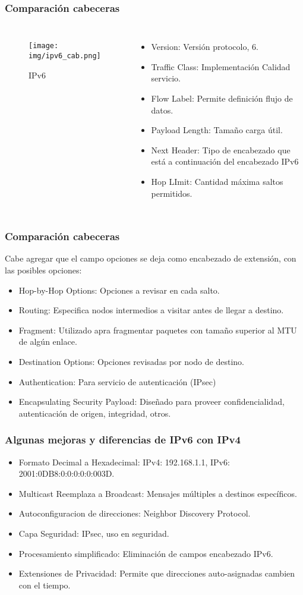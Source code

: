 \documentclass{beamer}
\begin{document}
\begin{frame}
  \frametitle{Comparación cabeceras}
  \begin{columns}[t]
    	\begin{figure}
		\centering
		\texttt{[image: img/ipv6\_cab.png]}
		\caption{IPv6}
	\end{figure}
    	\begin{itemize}
		\small
		\item
			Version: Versión protocolo, 6.
		\item
			Traffic Class: Implementación Calidad servicio.
		\item
			Flow Label: Permite definición flujo de datos.
		\item
			Payload Length: Tamaño carga útil.
		\item
			Next Header: Tipo de encabezado que está a 
			continuación del encabezado IPv6
		\item
			Hop LImit: Cantidad máxima saltos permitidos.
	\end{itemize}
  \end{columns}
\end{frame}
\begin{frame}
  \frametitle{Comparación cabeceras}
  Cabe agregar que el campo opciones se deja como encabezado de extensión,
  con las posibles opciones:
  \begin{itemize}
	\item
		Hop-by-Hop Options: Opciones a revisar en cada salto.
	\item
		Routing: Especifica nodos intermedios a visitar antes
		de llegar a destino.
	\item
		Fragment: Utilizado apra fragmentar paquetes con tamaño 
		superior al MTU de algún enlace.
	\item
		Destination Options: Opciones revisadas por nodo de 
		destino.
	\item
		Authentication: Para servicio de autenticación (IPsec)
	\item
		Encapsulating Security Payload: Diseñado para
		proveer confidencialidad, autenticación de origen, 
		integridad, otros.
  \end{itemize}
\end{frame}
\begin{frame}
  \frametitle{Algunas mejoras y diferencias de IPv6 con IPv4}
  \begin{itemize}
	\item
		Formato Decimal a Hexadecimal: 
		IPv4: 192.168.1.1, IPv6: 2001:0DB8:0:0:0:0:0:003D.
	\item
		Multicast Reemplaza a Broadcast: Mensajes múltiples
		a destinos específicos.
	\item
		Autoconfiguracion de direcciones: Neighbor Discovery
		Protocol.
	\item
		Capa Seguridad: IPsec, uso en seguridad.
	\item
		Procesamiento simplificado: Eliminación de campos
		encabezado IPv6.
	\item
		Extensiones de Privacidad: Permite que
		direcciones auto-asignadas  cambien con el tiempo.
  \end{itemize}
\end{frame}
\end{document}
